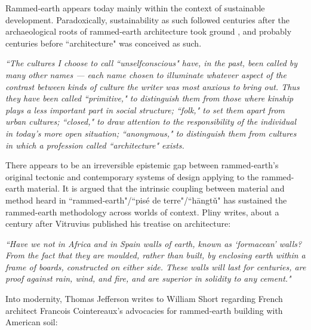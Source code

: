 Rammed-earth appears today mainly within the context of sustainable development. Paradoxically, sustainability as such followed centuries after the archaeological roots of rammed-earth architecture took ground \cite{RAMMEDEARTHHOUSE}, and probably centuries before ``architecture" was conceived as such.

\begin{flushright}
\small{
\textit{
``The cultures I choose to call ``unselfconscious" have, in the past, been called by many other names --- each name chosen to illuminate whatever aspect of the contrast between kinds of culture the writer was most anxious to bring out. Thus they have been called ``primitive," to distinguish them from those where kinship plays a less important part in social structure; ``folk," to set them apart from urban cultures; ``closed," to draw attention to the responsibility of the individual in today's more open situation; ``anonymous," to distinguish them from cultures in which a profession called ``architecture" exists.}} \cite[p33]{SYNOFFORM}
\end{flushright}

There appears to be an irreversible epistemic gap between rammed-earth's original tectonic and contemporary systems of design applying to the rammed-earth material. It is argued that the intrinsic coupling between material and method heard in ``rammed-earth"/``pis\'e de terre"/``h\=angt\v u" has sustained the rammed-earth methodology across worlds of context. Pliny writes, about a century after Vitruvius published his treatise on architecture:

\begin{flushright}
\small{
\textit{``Have we not in Africa and in Spain walls of earth, known as `formacean' walls? From the fact that they are moulded, rather than built, by enclosing earth within a frame of boards, constructed on either side. These walls will last for centuries, are proof against rain, wind, and fire, and are superior in solidity to any cement."}} \cite[p385]{NATHISTORY}
\end{flushright}

Into modernity, Thomas Jefferson writes to William Short regarding French architect Francois Cointereaux's advocacies for rammed-earth building with American soil:

